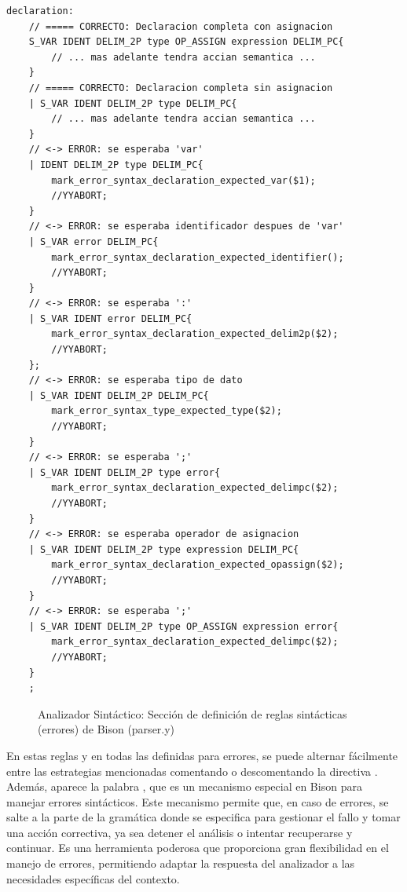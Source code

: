 \begin{lstlisting}[style=customflex]
declaration:
    // ===== CORRECTO: Declaracion completa con asignacion
    S_VAR IDENT DELIM_2P type OP_ASSIGN expression DELIM_PC{
        // ... mas adelante tendra accian semantica ...
    }
    // ===== CORRECTO: Declaracion completa sin asignacion
    | S_VAR IDENT DELIM_2P type DELIM_PC{
        // ... mas adelante tendra accian semantica ...
    }
    // <-> ERROR: se esperaba 'var'
    | IDENT DELIM_2P type DELIM_PC{
        mark_error_syntax_declaration_expected_var($1);
        //YYABORT;
    }
    // <-> ERROR: se esperaba identificador despues de 'var'
    | S_VAR error DELIM_PC{
        mark_error_syntax_declaration_expected_identifier();
        //YYABORT;
    }
    // <-> ERROR: se esperaba ':'
    | S_VAR IDENT error DELIM_PC{
        mark_error_syntax_declaration_expected_delim2p($2);
        //YYABORT;
    };
    // <-> ERROR: se esperaba tipo de dato
    | S_VAR IDENT DELIM_2P DELIM_PC{
        mark_error_syntax_type_expected_type($2);
        //YYABORT;
    }
    // <-> ERROR: se esperaba ';'
    | S_VAR IDENT DELIM_2P type error{
        mark_error_syntax_declaration_expected_delimpc($2);
        //YYABORT;
    }
    // <-> ERROR: se esperaba operador de asignacion
    | S_VAR IDENT DELIM_2P type expression DELIM_PC{
        mark_error_syntax_declaration_expected_opassign($2);
        //YYABORT;
    }
    // <-> ERROR: se esperaba ';'
    | S_VAR IDENT DELIM_2P type OP_ASSIGN expression error{
        mark_error_syntax_declaration_expected_delimpc($2);
        //YYABORT;
    }
    ;

\end{lstlisting}
\begin{figure}[h]
\caption{Analizador Sintáctico: Sección de definición de reglas sintácticas (errores) de Bison (parser.y)}
\label{fig:bisonErrorDeclarations}
\end{figure}

En estas reglas y en todas las definidas para errores, se puede alternar fácilmente entre las estrategias mencionadas comentando o descomentando la directiva . Además, aparece la palabra , que es un mecanismo especial en Bison para manejar errores sintácticos. Este mecanismo permite que, en caso de errores, se salte a la parte de la gramática donde se especifica  para gestionar el fallo y tomar una acción correctiva, ya sea detener el análisis o intentar recuperarse y continuar. Es una herramienta poderosa que proporciona gran flexibilidad en el manejo de errores, permitiendo adaptar la respuesta del analizador a las necesidades específicas del contexto.



